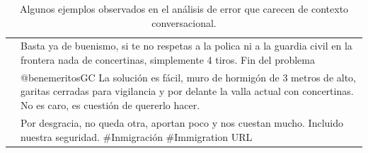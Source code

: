 \begin{table}
\begin{tabularx}{\textwidth}{l X}
                      & Basta ya de buenismo, si te no respetas a la polica ni a la guardia civil en la frontera nada de concertinas, simplemente 4 tiros. Fin del problema \\
                      & @benemeritosGC La solución es fácil, muro de hormigón de 3 metros de alto, garitas cerradas para vigilancia y por delante la valla actual con concertinas. No es caro, es cuestión de quererlo hacer. \\
                      & Por desgracia, no queda otra, aportan poco y nos cuestan mucho. Incluido nuestra seguridad. \#Inmigración \#Immigration URL \\
        \hline
    \end{tabularx}
    \caption{Algunos ejemplos observados en el análisis de error que carecen de contexto conversacional.}
    \label{tab:hateval_lack_of_context}
\end{table}





